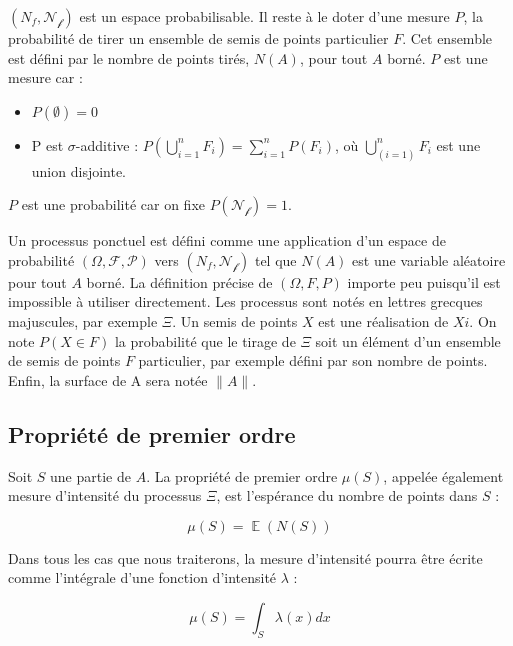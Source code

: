 \documentclass[
  11pt,
  french,
  A4paper,
  extrafontsizes,onecolumn,openright
  ]{memoir}
\theoremstyle{definition}
\theoremstyle{definition}
\theoremstyle{definition}
\theoremstyle{remark}
\begin{document}
\((N_f, \mathcal{N_f})\) est un espace probabilisable. Il reste à le
doter d'une mesure \(P\), la probabilité de tirer un ensemble de semis
de points particulier \(F\). Cet ensemble est défini par le nombre de
points tirés, \(N(A)\), pour tout \(A\) borné. \(P\) est une mesure car
:

\begin{itemize}
  \item $P(\emptyset)=0$
  \item P est $\sigma$-additive : $P(\bigcup_{i=1}^n F_i) = \sum_{i=1}^n {P(F_i)}$, où $\bigcup_(i=1)^n F_i$ est une union disjointe.
\end{itemize}

\(P\) est une probabilité car on fixe \(P(\mathcal{N_f})=1\).

Un processus ponctuel est défini comme une application d'un espace de
probabilité \((\Omega, \mathcal{F}, \mathcal{P})\) vers
\((N_f,\mathcal{N_f})\) tel que \(N(A)\) est une variable aléatoire pour
tout \(A\) borné. La définition précise de \((\Omega, F, P)\) importe
peu puisqu'il est impossible à utiliser directement. Les processus sont
notés en lettres grecques majuscules, par exemple \(\Xi\). Un semis de
points \(X\) est une réalisation de \(Xi\). On note \(P(X \in F)\) la
probabilité que le tirage de \(\Xi\) soit un élément d'un ensemble de
semis de points \(F\) particulier, par exemple défini par son nombre de
points. Enfin, la surface de A sera notée \(\|A\|\).

\subsection{Propriété de premier
ordre}\label{propriete-de-premier-ordre}

Soit \(S\) une partie de \(A\). La propriété de premier ordre
\(\mu(S)\), appelée également mesure d'intensité du processus \(\Xi\),
est l'espérance du nombre de points dans \(S\) :

\begin{equation}
  \mu(S)=\mathop{\mathbb{E}}(N(S))
  \label{eq:muSE}
\end{equation}

Dans tous les cas que nous traiterons, la mesure d'intensité pourra être
écrite comme l'intégrale d'une fonction d'intensité \(\lambda\) :

\begin{equation}
  \mu(S)=\int_S{\lambda(x)dx}
  \label{eq:muSint}
\end{equation}
\end{document}
